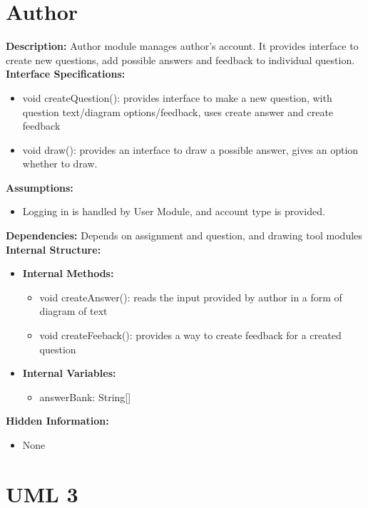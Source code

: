  
\chapter{Author}
\textbf{Description: }Author module manages author's account. It provides interface to create new questions, add possible answers and feedback to individual question.\\
\textbf{Interface Specifications:}
\begin{itemize}
    \item void createQuestion(): provides interface to make a new question, with question text/diagram options/feedback, uses create answer and create feedback
    \item void draw(): provides an interface to draw a possible answer, gives an option whether to draw.
    \end{itemize}
\textbf{Assumptions:}
\begin{itemize}
\item Logging in is handled by User Module, and account type is provided.
\end{itemize}
\textbf{Dependencies:}
Depends on assignment and question, and drawing tool modules \\
\textbf{Internal Structure:}
\begin{itemize}
\item          \textbf{Internal Methods:}
\begin{itemize}
    \item void createAnswer(): reads the input provided by author in a form of diagram of text
    \item void createFeeback(): provides a way to create feedback for a created question
\end{itemize}
     \item     \textbf{Internal Variables:}
     \begin{itemize}
 \item answerBank: String[]
 \end{itemize}
 \end{itemize}
\textbf{Hidden Information:}
\begin{itemize}
\item None
\end{itemize}



\chapter{UML 3}

